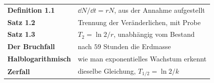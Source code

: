 \begin{merksatz}
\begin{center}
\renewcommand{\arraystretch}{1.5}
\begin{tabular}{@{}P{3.2cm}P{5.4cm}@{}}
\toprule
\textbf{Definition 1.1} & $\dd N/\dd t = rN$, aus der Annahme aufgestellt\\
\textbf{Satz 1.2} & Trennung der Veränderlichen, mit Probe\\
\textbf{Satz 1.3} & $T_2 = \ln 2/r$, unabhängig vom Bestand\\
\textbf{Der Bruchfall} & nach $59$ Stunden die Erdmasse\\
\textbf{Halb\-logarithmisch} & wie man exponentielles Wachstum erkennt\\
\textbf{Zerfall} & dieselbe Gleichung, $T_{1/2} = \ln2/k$\\
\bottomrule
\end{tabular}
\end{center}

\begin{center}
\begin{minipage}{0.88\textwidth}
\end{minipage}
\end{center}
\end{merksatz}

